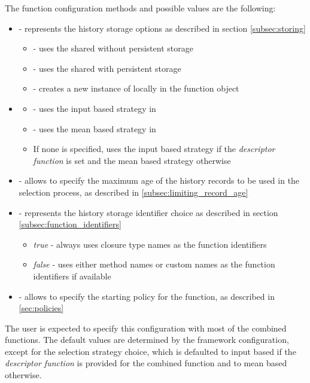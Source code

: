 The function configuration methods and possible values are the following:

\begin{itemize}
	\item {} - represents the history storage options as described in section \ref{subsec:storing}
	\begin{itemize}
		\item {} - uses the shared  without persistent storage
		\item {} - uses the shared  with persistent storage
		\item {} - creates a new instance of  locally in the function object
	\end{itemize}
\item {}
\begin{itemize}
	\item {} - uses the input based strategy in 
	\item {} - uses the mean based strategy in 
	\item If none is specified, uses the input based strategy if the \textit{descriptor function} is set and the mean based strategy otherwise
\end{itemize}
\item {} - allows to specify the maximum age of the history records to be used in the selection process, as described in \ref{subsec:limiting_record_age}
\item {} - represents the history storage identifier choice as described in section \ref{subsec:function_identifiers}
\begin{itemize}
	\item \textit{true} - always uses closure type names as the function identifiers
	\item \textit{false} - uses either method names or custom names as the function identifiers if available
\end{itemize}
\item {} - allows to specify the starting policy for the function, as described in \ref{sec:policies}
\end{itemize}

The user is expected to specify this configuration with most of the combined functions. The default values are determined by the framework configuration, except for the selection strategy choice, which is defaulted to input based if the \textit{descriptor function} is provided for the combined function and to mean based otherwise.

